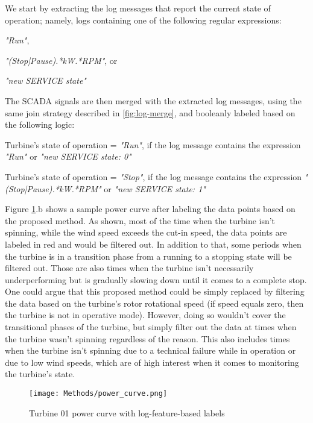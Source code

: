       We start by extracting the log messages that report the current state of operation; namely, logs containing one of the following regular expressions:
      \begin{bulletList}
        \item \emph{"Run"},
        \item \emph{"(Stop|Pause).*kW.*RPM"}, or
        \item \emph{"new SERVICE state"}
      \end{bulletList}
      The SCADA signals are then merged with the extracted log messages, using the same join strategy described in \ref{fig:log-merge}, and booleanly labeled based on the following logic:
      \begin{bulletList}
        \item Turbine's state of operation = \emph{"Run"}, if the log message contains the expression \emph{"Run"} or \emph{"new SERVICE state: 0"}
        \item Turbine's state of operation = \emph{"Stop"}, if the log message contains the expression \emph{"(Stop|Pause).*kW.*RPM"} or \emph{"new SERVICE state: 1"}
      \end{bulletList}

      Figure \ref{fig:power_curve}.b shows a sample power curve after labeling the data points based on the proposed method. 
      As shown, most of the time when the turbine isn't spinning, while the wind speed exceeds the cut-in speed, the data points are labeled 
      in red and would be filtered out. In addition to that, some periods when the turbine is in a transition phase from a running to a stopping state 
      will be filtered out. Those are also times when the turbine isn't necessarily underperforming but is gradually slowing down until it comes to a complete stop.
      One could argue that this proposed method could be simply replaced by filtering the data based on the turbine's rotor rotational speed 
      (if speed equals zero, then the turbine is not in operative mode). However, doing so wouldn't cover the transitional phases of the turbine, but simply 
      filter out the data at times when the turbine wasn't spinning regardless of the reason. This also includes times when the turbine isn't spinning 
      due to a technical failure while in operation or due to low wind speeds, which are of high interest when it comes to monitoring the turbine's state.
      
      \begin{figure}[H]
        \begin{center}
          \texttt{[image: Methods/power\_curve.png]}
        \end{center}
        \caption{Turbine 01 power curve with log-feature-based labels}
        \label{fig:power_curve}
      \end{figure}

